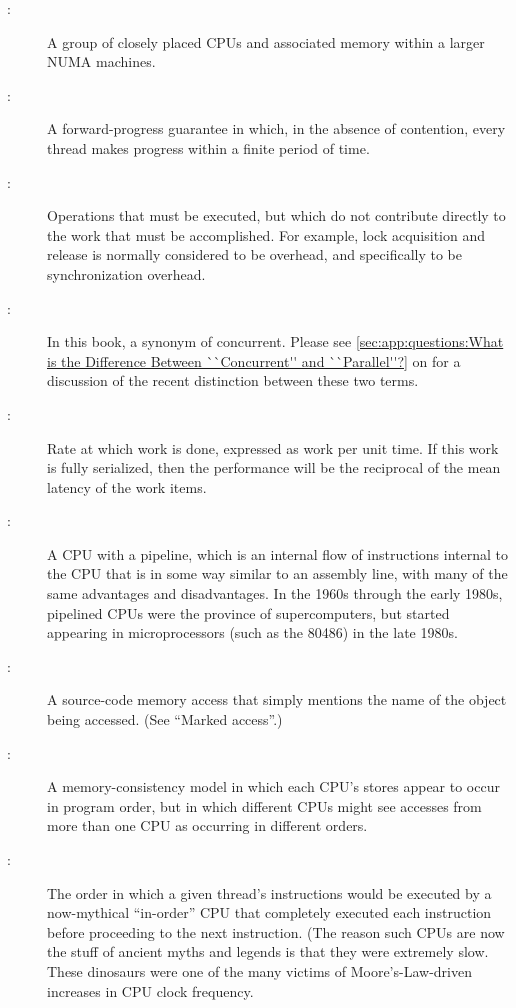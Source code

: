 \begin{description}
\item[:]
	A group of closely placed CPUs and associated memory within
	a larger NUMA machines.
\item[:]
	A forward-progress guarantee in which, in the absence of
	contention, every thread makes progress within a finite
	period of time.
\item[:]
	Operations that must be executed, but which do not contribute
	directly to the work that must be accomplished.
	For example, lock acquisition and release is normally considered
	to be overhead, and specifically to be synchronization overhead.
\item[:]
	In this book, a synonym of concurrent.
	Please see \cref{sec:app:questions:What is the Difference Between ``Concurrent'' and ``Parallel''?}
	on 
	for a discussion of the recent distinction between these two
	terms.
\item[:]
	Rate at which work is done, expressed as work per unit time.
	If this work is fully serialized, then the performance will
	be the reciprocal of the mean latency of the work items.
\item[:]
	A CPU with a pipeline, which is
	an internal flow of instructions internal to the CPU that
	is in some way similar to an assembly line, with many of
	the same advantages and disadvantages.
	In the 1960s through the early 1980s, pipelined CPUs were the
	province of supercomputers, but started appearing in microprocessors
	(such as the 80486) in the late 1980s.
\item[:]
	A source-code memory access that simply mentions the name of
	the object being accessed.
	(See ``Marked access''.)
\item[:]
	A memory-consistency model in which each CPU's stores appear to
	occur in program order, but in which different CPUs might see
	accesses from more than one CPU as occurring in different orders.
\item[:]
	The order in which a given thread's instructions
	would be executed by a now-mythical ``in-order'' CPU that
	completely executed each instruction before proceeding to
	the next instruction.
	(The reason such CPUs are now the stuff of ancient myths
	and legends is that they were extremely slow.
	These dinosaurs were one of the many victims of
	Moore's-Law-driven increases in CPU clock frequency.

\end{description}
